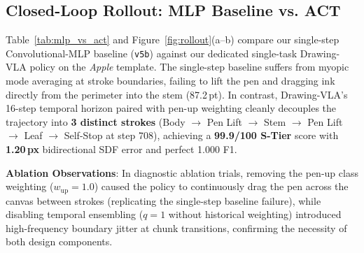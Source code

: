 \documentclass[10pt,twocolumn,letterpaper]{article}
\begin{document}
\begin{table}[t]
  \centering
  \caption{Unified Multi-Class and Dual-Mode evaluation across Guided Tracing Mode ($O_t^{(1)} = I_{\text{target}}$) and Blank-Canvas Mode ($O_t^{(1)} = \mathbf{0}$).}
  \label{tab:multiclass_dual}
  \small
\end{table}

\subsection{Closed-Loop Rollout: MLP Baseline vs. ACT}
Table~\ref{tab:mlp_vs_act} and Figure~\ref{fig:rollout}(a--b) compare our single-step Convolutional-MLP baseline (\texttt{v5b}) against our dedicated single-task Drawing-VLA policy on the \emph{Apple} template. The single-step baseline suffers from myopic mode averaging at stroke boundaries, failing to lift the pen and dragging ink directly from the perimeter into the stem (87.2\,pt). In contrast, Drawing-VLA's 16-step temporal horizon paired with pen-up weighting cleanly decouples the trajectory into \textbf{3 distinct strokes} (Body $\to$ Pen Lift $\to$ Stem $\to$ Pen Lift $\to$ Leaf $\to$ Self-Stop at step 708), achieving a \textbf{99.9/100 S-Tier} score with \textbf{1.20\,px} bidirectional SDF error and perfect 1.000 F1.

\noindent\textbf{Ablation Observations}: In diagnostic ablation trials, removing the pen-up class weighting ($w_{\text{up}} = 1.0$) caused the policy to continuously drag the pen across the canvas between strokes (replicating the single-step baseline failure), while disabling temporal ensembling ($q=1$ without historical weighting) introduced high-frequency boundary jitter at chunk transitions, confirming the necessity of both design components.
\end{document}
